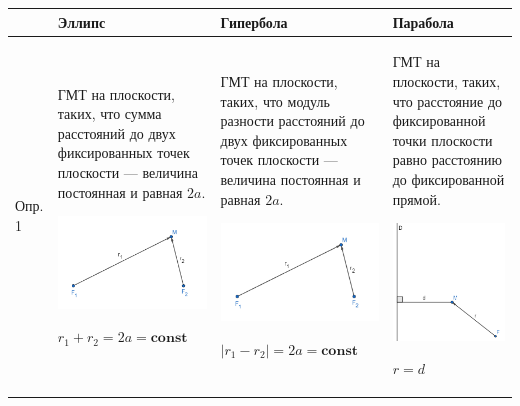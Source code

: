 \documentclass[twoside]{book}
\begin{document}
\begin{center}
    \begin{longtable}{|p{2.5cm}|p{4.5cm}|p{4.5cm}|p{4.5cm}|}
        \hline
         &
        Эллипс
         &
        Гипербола
         &
        Парабола
        \\
        \hline
        Опр. 1
         &
        ГМТ на плоскости, таких, что сумма расстояний до двух фиксированных точек плоскости --- величина постоянная и равная \(2a\).
        \begin{center}
            \includegraphics[width=4.5cm]{Images/Chapter_1/3-1-1.png}
        \end{center}
        \(r_1 + r_2 = 2a = \mathbf{const}\)
         &
        ГМТ на плоскости, таких, что модуль разности расстояний до двух фиксированных точек плоскости --- величина постоянная и равная \(2a\).
        \begin{center}
            \includegraphics[width=4.5cm]{Images/Chapter_1/3-1-1.png}
        \end{center}
        \(|r_1 - r_2| = 2a = \mathbf{const}\)
         &
        ГМТ на плоскости, таких, что расстояние до фиксированной точки плоскости равно расстоянию до фиксированной прямой.
        \begin{center}
            \includegraphics[width=4.5cm]{Images/Chapter_1/3-1-2.png}
        \end{center}
        \(r = d\)
        \\

\end{longtable}
\end{center}
\end{document}
